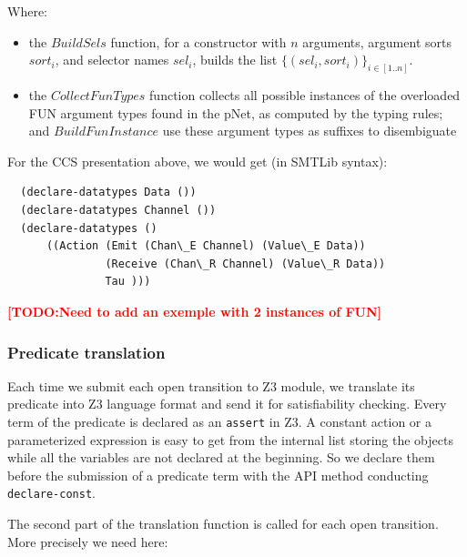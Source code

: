 \documentclass{lncs/llncs}
\newcommand{\TODO}[1]{\textcolor{red}{\textbf{[TODO:#1]}}}
\newcommand{\QIN}[1]{\textcolor{airforceblue}{#1}}
\begin{document}
\smallskip
Where:
\begin{itemize}
  \item the $BuildSels$ function, for a constructor with $n$ arguments,
argument sorts $sort_i$, and selector names $sel_i$, builds the list
$\{(sel_i, sort_i)\}_{i\in[1..n]}$.
\item the $CollectFunTypes$ function collects all possible instances
  of the overloaded FUN argument types found in the pNet, as computed by the typing
  rules; and $BuildFunInstance$ use these argument types as suffixes
  to disembiguate 
\end{itemize}


\begin{example}
  For the CCS presentation above, we would get (in SMTLib syntax):
\begin{lstlisting}
  (declare-datatypes Data ())
  (declare-datatypes Channel ())
  (declare-datatypes ()
      ((Action (Emit (Chan\_E Channel) (Value\_E Data))
               (Receive (Chan\_R Channel) (Value\_R Data))
               Tau )))
  \end{lstlisting}
\end{example}

\TODO{Need to add an exemple with 2 instances of FUN}

 
\subsubsection{Predicate translation}

\QIN{Each time we submit each open transition to Z3 module, we translate
  its predicate into Z3 language format and send it for satisfiability
  checking. Every term of the predicate is declared as an
  \texttt{assert} in Z3. A constant action or a parameterized
  expression is easy to get from the internal list storing the objects
  while all the variables are not declared at the beginning. So we
  declare them before the submission of a predicate term with the API
  method conducting \texttt{declare-const}.}

The second part of the translation function is called for each open
transition. More precisely we need here:
\end{document}
